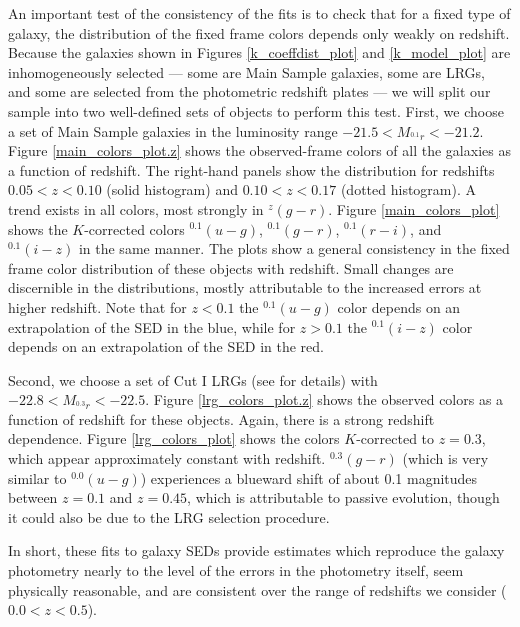 \documentclass[10pt,preprint]{aastex}
\newcommand{\band}[2]{\ensuremath{^{{#1}}\!{#2}}}
\begin{document}
An important test of the consistency of the fits is to check that for
a fixed type of galaxy, the distribution of the fixed frame colors
depends only weakly on redshift. Because the galaxies shown in Figures
\ref{k_coeffdist_plot} and \ref{k_model_plot} are inhomogeneously
selected --- some are Main Sample galaxies, some are LRGs, and some
are selected from the photometric redshift plates --- we will split
our sample into two well-defined sets of objects to perform this
test. First, we choose a set of Main Sample galaxies in the luminosity
range $-21.5 < M_{\band{0.1}{r}} < -21.2$. Figure
\ref{main_colors_plot.z} shows the observed-frame colors of all the
galaxies as a function of redshift.  The right-hand panels show the
distribution for redshifts $0.05<z<0.10$ (solid histogram) and
$0.10<z<0.17$ (dotted histogram). A trend exists in all colors, most
strongly in $\band{z}{(g-r)}$. Figure \ref{main_colors_plot} shows the
$K$-corrected colors $\band{0.1}{(u-g)}$, $\band{0.1}{(g-r)}$,
$\band{0.1}{(r-i)}$, and $\band{0.1}{(i-z)}$ in the same manner.  The
plots show a general consistency in the fixed frame color distribution
of these objects with redshift.  Small changes are discernible in the
distributions, mostly attributable to the increased errors at higher
redshift. Note that for $z<0.1$ the $\band{0.1}{(u-g)}$ color depends
on an extrapolation of the SED in the blue, while for $z>0.1$ the
$\band{0.1}{(i-z)}$ color depends on an extrapolation of the SED in
the red.

Second, we choose a set of Cut I LRGs (see \citealt{eisenstein01a} for
details) with $-22.8 < M_{\band{0.3}{r}} < -22.5$. Figure
\ref{lrg_colors_plot.z} shows the observed colors as a function of
redshift for these objects. Again, there is a strong redshift
dependence. Figure \ref{lrg_colors_plot} shows the colors
$K$-corrected to $z=0.3$, which appear approximately constant with
redshift.
$\band{0.3}{(g-r)}$ (which is very similar to $\band{0.0}{(u-g)}$)
experiences a blueward shift of about 0.1 magnitudes between $z=0.1$
and $z=0.45$, which is attributable to passive evolution, though it
could also be due to the LRG selection procedure.

In short, these fits to galaxy SEDs provide estimates which reproduce
the galaxy photometry nearly to the level of the errors in the
photometry itself, seem physically reasonable, and are consistent over
the range of redshifts we consider ($0.0 < z < 0.5$). 
\end{document}
